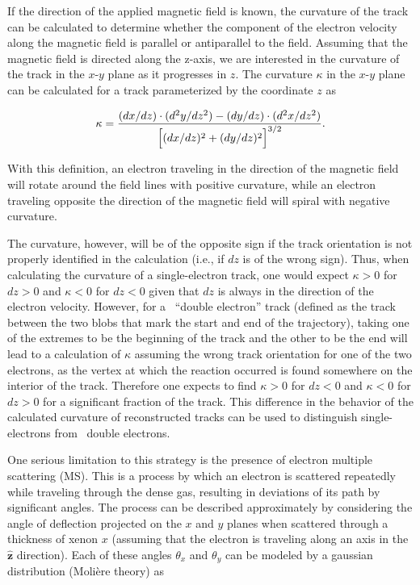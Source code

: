 \documentclass{JINST}
\begin{document}
If the direction of the applied magnetic field is known, the curvature of the track can be calculated to determine whether the component of the electron velocity along the magnetic field is parallel or antiparallel to the field.  Assuming that the magnetic field is directed along the z-axis, we are interested in the curvature of the track in the $x$-$y$ plane as it progresses in $z$.  The curvature $\kappa$ in the $x$-$y$ plane can be calculated for a track parameterized by the coordinate $z$ as

\begin{equation}\label{eqn_curv}
\kappa = \frac{(dx/dz)\cdot(d^2y/dz^2) - (dy/dz)\cdot(d^2x/dz^2)}{\Bigl[(dx/dz)^2 + (dy/dz)^2\Bigr]^{3/2}}.
\end{equation}

With this definition, an electron traveling in the direction of the magnetic field will rotate around the field lines with positive curvature, while an electron traveling opposite the direction of the magnetic field will spiral with negative curvature.  

The curvature, however, will be of the opposite sign if the track orientation is not properly identified in the calculation (i.e., if $dz$ is of the wrong sign).  Thus, when calculating the curvature of a single-electron track, one would expect $\kappa > 0$ for $dz > 0$ and $\kappa < 0$ for $dz < 0$ given that $dz$ is always in the direction of the electron velocity.  However, for a \bbonu\ ``double electron'' track (defined as the track between the two blobs that mark the start and end of the trajectory), taking one of the extremes to be the beginning of the track and the other to be the end will lead to a calculation of $\kappa$ assuming the wrong track orientation for one of the two electrons, as the vertex at which the reaction occurred is found somewhere on the interior of the track.  Therefore one expects to find $\kappa > 0$ for $dz < 0$ and $\kappa < 0$ for $dz > 0$ for a significant fraction of the track.  This difference in the behavior of the calculated curvature of reconstructed tracks can be used to distinguish single-electrons from \bbonu\ double electrons.

One serious limitation to this strategy is the presence of electron multiple scattering (MS). This is a process by 
which an electron is scattered repeatedly while traveling through the dense gas, resulting in deviations of its
path by significant angles. The process can be described approximately by considering the angle of deflection projected on the $x$ and $y$ planes when scattered through a thickness of xenon $x$ (assuming that the electron is traveling along an axis in the $\hat{\mathbf{z}}$ direction). Each of these angles $\theta_x$ and $\theta_y$ can be modeled by a gaussian distribution (Moli\`{e}re theory) as
\end{document}
